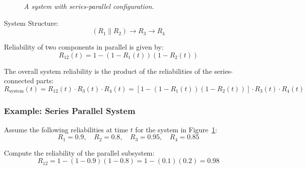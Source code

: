\documentclass[twoside]{book}
\begin{document}
\begin{figure}[H]
\begin{center}
\end{center}
\caption{\textit{A system with series-parallel configuration.}}
\label{fig:series-parallel-system}
\end{figure}

{System Structure:}
\[
(R_1 \parallel R_2) \longrightarrow R_3 \longrightarrow R_4
\]

Reliability of two components in parallel is given by:
\[
R_{12}(t) = 1 - (1 - R_1(t))(1 - R_2(t))
\]

The overall system reliability is the product of the reliabilities of the series-connected parts:
\[
R_{\text{system}}(t) = R_{12}(t) \cdot R_3(t) \cdot R_4(t) = \left[1 - (1 - R_1(t))(1 - R_2(t))\right] \cdot R_3(t) \cdot R_4(t)
\]

\subsubsection{Example: Series Parallel System}

Assume the following reliabilities at time $t$ for the system in Figure~\ref{fig:series-parallel-system}:
\[
R_1 = 0.9, \quad R_2 = 0.8, \quad R_3 = 0.95, \quad R_4 = 0.85
\]

Compute the reliability of the parallel subsystem:
\[
R_{12} = 1 - (1 - 0.9)(1 - 0.8) = 1 - (0.1)(0.2) = 0.98
\]
\end{document}
